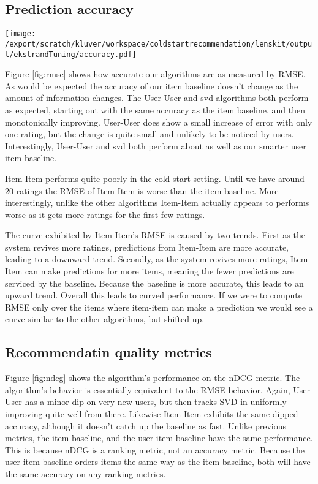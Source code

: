 \documentclass[letterpaper]{sig-alternate}
\begin{document}
\subsection{Prediction accuracy}
\begin{figure*}
  \centering
  \texttt{[image: /export/scratch/kluver/workspace/coldstartrecommendation/lenskit/output/ekstrandTuning/accuracy.pdf]}
  \caption{TODO}
  \label{fig:rmse}
  \label{fig:ndcg}
\end{figure*}
  Figure \ref{fig:rmse} shows how accurate our algorithms are as measured by RMSE.
  As would be expected the accuracy of our item baseline doesn't change as the amount of information changes.
  The User-User and svd algorithms both perform as expected, starting out with the same accuracy as the item baseline, and then monotonically improving.
  User-User does show a small increase of error with only one rating, but the change is quite small and unlikely to be noticed by users.
  Interestingly, User-User and svd both perform about as well as our smarter user item baseline. %

  Item-Item performs quite poorly in the cold start setting.
  Until we have around 20 ratings the RMSE of Item-Item is worse than the item baseline.
  More interestingly, unlike the other algorithms Item-Item actually appears to performs worse as it gets more ratings for the first few ratings.
  
  The curve exhibited by Item-Item's RMSE is caused by two trends.
  First as the system revives more ratings, predictions from Item-Item are more accurate, leading to a downward trend.
  Secondly, as the system revives more ratings, Item-Item can make predictions for more items, meaning the fewer predictions are serviced by the baseline.
  Because the baseline is more accurate, this leads to an upward trend.
  Overall this leads to curved performance.
  If we were to compute RMSE only over the items where item-item can make a prediction we would see a curve similar to the other algorithms, but shifted up.

\subsection {Recommendatin quality metrics}
  Figure \ref{fig:ndcg} shows the algorithm's performance on the nDCG metric.
  The algorithm's behavior is essentially equivalent to the RMSE behavior.
  Again, User-User has a minor dip on very new users, but then tracks SVD in uniformly improving quite well from there.
  Likewise Item-Item exhibits the same dipped accuracy, although it doesn't catch up the baseline as fast.
  Unlike previous metrics, the item baseline, and the user-item baseline have the same performance.
  This is because nDCG is a ranking metric, not an accuracy metric.
  Because the user item baseline orders items the same way as the item baseline, both will have the same accuracy on any ranking metrics.
\end{document}
